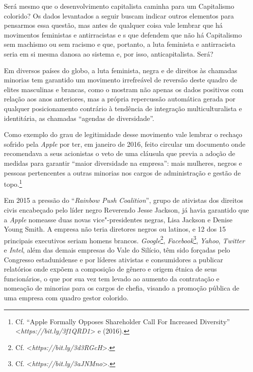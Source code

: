 Será mesmo que o desenvolvimento capitalista caminha para um Capitalismo
colorido? Os dados levantados a seguir buscam indicar outros elementos
para pensarmos essa questão, mas antes de qualquer coisa vale lembrar
que há movimentos feministas e antirracistas e s que defendem que
não há Capitalismo sem machismo ou sem racismo e que, portanto, a luta
feminista e antirracista seria em si mesma danosa ao sistema e, por
isso, anticapitalista. Será?

Em diversos países do globo, a luta feminista, negra e de direitos às
chamadas minorias tem garantido um movimento irrefreável de reversão
deste quadro de elites masculinas e brancas, como o mostram não apenas
os dados positivos com relação aos anos anteriores, mas a própria
repercussão automática gerada por qualquer posicionamento contrário à
tendência de integração multiculturalista e identitária, as chamadas
``agendas de diversidade''.

Como exemplo do grau de legitimidade desse movimento vale lembrar o
rechaço sofrido pela \emph{Apple} por ter, em janeiro de 2016, feito
circular um documento onde recomendava a seus acionistas o veto de uma
cláusula que previa a adoção de medidas para garantir ``maior
diversidade na empresa'': mais mulheres, negros e pessoas pertencentes a
outras minorias nos cargos de administração e gestão de topo.\footnote{Cf.
  ``Apple Formally Opposes Shareholder Call For Increased Diversity''
  \textless{}\emph{https://bit.ly/3f1QRD1}\textgreater{}
  e  (2016).}

Em 2015 a pressão do ``\emph{Rainbow Push Coalition}'', grupo de
ativistas dos direitos civis encabeçado pelo líder negro Reverendo Jesse
Jackson, já havia garantido que a \emph{Apple} nomeasse duas novas
vice"-presidentes negras, Lisa Jackson e Denise Young Smith. A empresa
não teria diretores negros ou latinos, e 12 dos 15 principais executivos
seriam homens brancos. \emph{Google}\footnote{Cf.
  \textless{}\emph{https://bit.ly/3d3RGcH}\textgreater{}.},
\emph{Facebook}\footnote{Cf.
  \textless{}\emph{https://bit.ly/3aJNMno}\textgreater{}.},
\emph{Yahoo}, \emph{Twitter} e \emph{Intel}, além das demais empresas do
Vale do Silício, têm sido forçadas pelo Congresso estadunidense e por
líderes ativistas e consumidores a publicar relatórios onde expõem a
composição de gênero e origem étnica de seus funcionários, o que por sua
vez tem levado ao aumento da contratação e nomeação de minorias para os
cargos de chefia, visando a promoção pública de uma empresa com quadro
gestor colorido.

